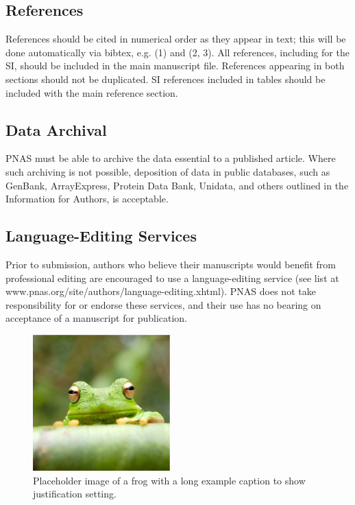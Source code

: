 \documentclass[9pt,twocolumn,twoside,]{pnas-new}
\begin{document}
\hypertarget{references}{%
\subsection{References}\label{references}}

References should be cited in numerical order as they appear in text;
this will be done automatically via bibtex, e.g. (1) and (2, 3). All
references, including for the SI, should be included in the main
manuscript file. References appearing in both sections should not be
duplicated. SI references included in tables should be included with the
main reference section.

\hypertarget{data-archival}{%
\subsection{Data Archival}\label{data-archival}}

PNAS must be able to archive the data essential to a published article.
Where such archiving is not possible, deposition of data in public
databases, such as GenBank, ArrayExpress, Protein Data Bank, Unidata,
and others outlined in the Information for Authors, is acceptable.

\hypertarget{language-editing-services}{%
\subsection{Language-Editing Services}\label{language-editing-services}}

Prior to submission, authors who believe their manuscripts would benefit
from professional editing are encouraged to use a language-editing
service (see list at www.pnas.org/site/authors/language-editing.xhtml).
PNAS does not take responsibility for or endorse these services, and
their use has no bearing on acceptance of a manuscript for publication.

\begin{figure}
\centering
\includegraphics{frog.png}
\caption{Placeholder image of a frog with a long example caption to show
justification setting.{}}
\end{figure}
\end{document}

